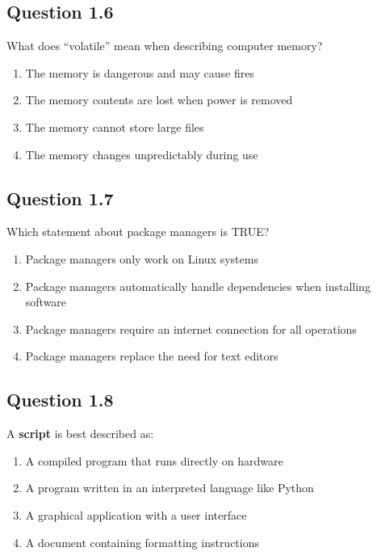 \documentclass[
  letterpaper,
  DIV=11,
  numbers=noendperiod]{scrreprt}
\providecommand{\tightlist}{%
  \setlength{\itemsep}{0pt}\setlength{\parskip}{0pt}}
\begin{document}
\subsection{Question 1.6}\label{question-1.6}

What does ``volatile'' mean when describing computer memory?

\begin{enumerate}
\def\labelenumi{\Alph{enumi})}
\tightlist
\item
  The memory is dangerous and may cause fires\\
\item
  The memory contents are lost when power is removed\\
\item
  The memory cannot store large files\\
\item
  The memory changes unpredictably during use
\end{enumerate}

\subsection{Question 1.7}\label{question-1.7}

Which statement about package managers is TRUE?

\begin{enumerate}
\def\labelenumi{\Alph{enumi})}
\tightlist
\item
  Package managers only work on Linux systems\\
\item
  Package managers automatically handle dependencies when installing
  software\\
\item
  Package managers require an internet connection for all operations\\
\item
  Package managers replace the need for text editors
\end{enumerate}

\subsection{Question 1.8}\label{question-1.8}

A \textbf{script} is best described as:

\begin{enumerate}
\def\labelenumi{\Alph{enumi})}
\tightlist
\item
  A compiled program that runs directly on hardware\\
\item
  A program written in an interpreted language like Python\\
\item
  A graphical application with a user interface\\
\item
  A document containing formatting instructions
\end{enumerate}
\end{document}
